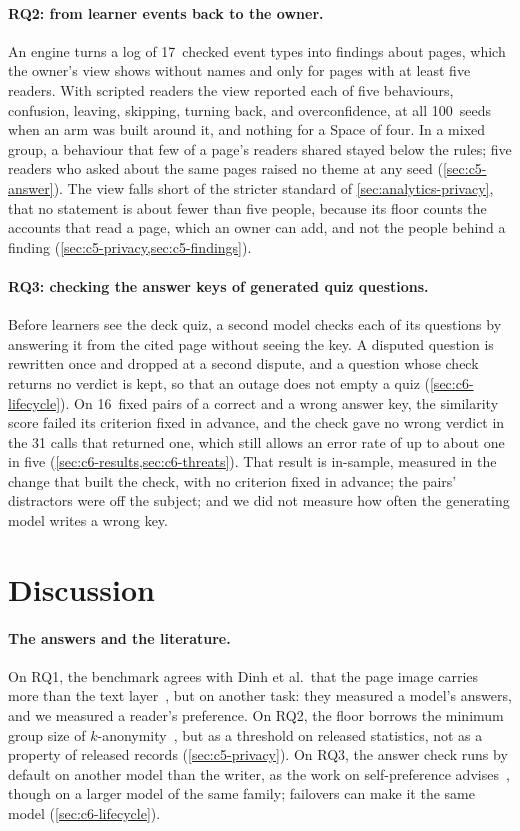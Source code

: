 \paragraph{RQ2: from learner events back to the owner.}
An engine turns a log of 17~checked event types into findings about pages,
which the owner's view shows without names and only for pages with at least
five readers. With scripted readers the view reported each of five
behaviours, confusion, leaving, skipping, turning back, and overconfidence,
at all 100~seeds when an arm was built around it, and nothing for a Space
of four. In a mixed group, a behaviour that few of a page's readers shared
stayed below the rules; five readers who asked about the same pages
raised no theme at any seed (\cref{sec:c5-answer}). The view falls short of
the stricter standard of \cref{sec:analytics-privacy}, that no statement is
about fewer than five people, because its floor counts the accounts that read
a page, which an owner can add, and not the people behind a finding
(\cref{sec:c5-privacy,sec:c5-findings}).

\paragraph{RQ3: checking the answer keys of generated quiz questions.}
Before learners see the deck quiz, a second model checks each of its
questions by answering it from the cited page without seeing the key. A
disputed question is rewritten once and dropped at a second dispute, and a
question whose check returns no verdict is kept, so that an outage does not
empty a quiz (\cref{sec:c6-lifecycle}). On 16~fixed pairs of a correct and a
wrong answer key, the similarity score failed its criterion fixed in advance,
and the check gave no wrong verdict in the 31 calls that returned one, which
still allows an error rate of up to about one in five
(\cref{sec:c6-results,sec:c6-threats}). That
result is in-sample, measured in the change that built the check, with no
criterion fixed in advance; the pairs' distractors were off the subject; and
we did not measure how often the generating model writes a wrong key.

\section{Discussion}
\label{sec:discussion}

\paragraph{The answers and the literature.}
On RQ1, the benchmark agrees with Dinh et al.\ that the page image carries
more than the text layer~\cite{dinh2025slides}, but on another task: they
measured a model's answers, and we measured a reader's preference. On RQ2,
the floor borrows the minimum group size of
$k$-anonymity~\cite{sweeney2002kanonymity}, but as a threshold on released
statistics, not as a property of released records (\cref{sec:c5-privacy}). On RQ3, the answer check runs by default on
another model than the writer, as the work on self-preference
advises~\cite{panickssery2024selfpreference}, though on a larger model of
the same family; failovers can make it the same model
(\cref{sec:c6-lifecycle}).

